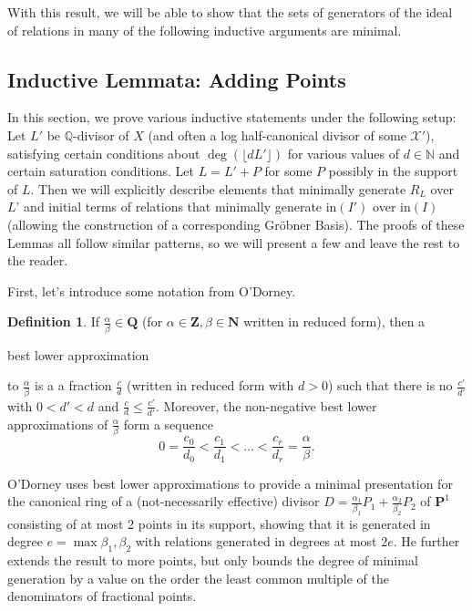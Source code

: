 \documentclass{amsart}
\theoremstyle{plain}
\theoremstyle{definition}
\newtheorem{defn}[thm]{Definition}
\theoremstyle{remark}
\numberwithin{equation}{section}
\newcommand\ssec{\subsection}
\newcommand \sx{\mathscr X}
\newcommand \halfcan{L}
\newcommand \initial{\text{in}}
\begin{document}
With this result, we will be able to show that the sets of generators of the ideal of relations in many of the following inductive arguments are minimal.

\ssec{Inductive Lemmata: Adding Points}
\label{ssec:add_pts}
In this section, we prove various inductive statements under the following setup:
Let $\halfcan'$ be $\mathbb{Q}$-divisor of $X$ (and often a log half-canonical divisor of some $\sx'$), satisfying certain conditions about $\deg(\lfloor d \halfcan'\rfloor)$ for various values of $d\in\mathbb{N}$ and certain saturation conditions. Let $\halfcan=\halfcan'+P$ for some $P$ possibly in the support of $\halfcan$.  Then we will explicitly describe elements that minimally generate $R_\halfcan$ over $\halfcan$' and initial terms of relations that minimally generate $\initial(I')$ over $\initial(I)$ (allowing the construction of a corresponding Gr\"{o}bner Basis).  The proofs of these Lemmas all follow similar patterns, so we will present a few  and leave the rest to the reader.

First, let's introduce some notation from O'Dorney.   
\begin{defn}\label{den:lower-approximation}
If $\frac{\alpha}{\beta}\in \mathbf{Q}$ (for $\alpha\in \mathbf{Z}, \beta\in \mathbf{N}$ written in reduced form), then a \begin{bf}{best lower approximation}\end{bf} to $\frac{\alpha}{\beta}$ is a a fraction $\frac{c}{d}$ (written in reduced form with $d>0$) such that there is no $\frac{c'}{d'}$ with $0<d'<d$ and $\frac{c}{d}\le \frac{c'}{d'}$.  Moreover, the non-negative best lower approximations of $\frac{\alpha}{\beta}$ form a sequence
\[
	0=\frac{c_0}{d_0} < \frac{c_1}{d_1} < \ldots < \frac{c_r}{d_r} = \frac{\alpha}{\beta}.
\]
\end{defn}

O'Dorney uses best lower approximations to provide a minimal presentation for the canonical ring of a (not-necessarily effective) divisor $D=\frac{\alpha_1}{\beta_1}P_1+\frac{\alpha_2}{\beta_2}P_2$ of $\mathbf{P}^1$ consisting of at most 2 points in its support, showing that it is generated in degree $e=\max{\beta_1,\beta_2}$ with relations generated in degrees at most $2e$.  He further extends the result to more points, but only bounds the degree of minimal generation by a value on the order the least common multiple of the denominators of fractional points.  
\end{document}
